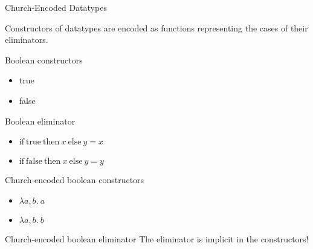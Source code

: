\documentclass[mathserif]{beamer}
\newcommand{\n}[1]{\textrm{#1}}
\begin{document}
\begin{frame}{Church-Encoded Datatypes}

Constructors of datatypes are encoded as functions representing the
cases of their eliminators.

\begin{block}{Boolean constructors}
\begin{itemize}
\item true
\item false
\end{itemize}
\end{block}

\begin{block}{Boolean eliminator}
\begin{itemize}
\item $\n{if} ~ \n{true} ~ \n{then} ~ x ~ \n{else} ~ y = x$
\item $\n{if} ~ \n{false} ~ \n{then} ~ x ~ \n{else} ~ y = y$
\end{itemize}
\end{block}

\begin{block}{Church-encoded boolean constructors}
\begin{itemize}
\item $\lambda a,b. ~ a$
\item $\lambda a,b. ~ b$
\end{itemize}
\end{block}

\begin{block}{Church-encoded boolean eliminator}
The eliminator is implicit in the constructors!
\end{block}



\end{frame}




\end{document}
